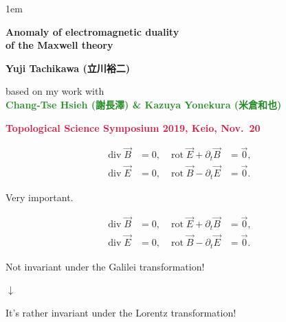 \documentclass[xcolor={svgnames,rgb}]{beamer}
\date[]{}
\def\bff{\ifmmode\else\bfseries\fi}
\def\red#1{\textcolor{Crimson}{\bff #1}}
\def\green#1{\textcolor{ForestGreen}{\bff #1}}
\def\blue#1{\textcolor{myblue}{\bff #1}}
\def\alert#1{\red{#1}}
\begin{document}
\parskip1em 
\boldmath
\def\baselinestretch{1.1}



\def\incb#1{\vcenter{\hbox{\texttt{[image: \#1]}}}}
\def\inc#1{\vcenter{\hbox{\texttt{[image: \#1]}}}}
\def\incx#1{\vcenter{\hbox{\texttt{[image: \#1]}}}}
\def\incc#1{\vcenter{\hbox{\texttt{[image: \#1]}}}}

\begin{frame}
\bigskip\bigskip\bigskip\bigskip\bigskip

\vfill


\begin{exampleblock}{}
\begin{center}\LARGE\bfseries
\color{math}
Anomaly of electromagnetic duality \\
of the Maxwell theory
\end{center}
\end{exampleblock}

\bigskip\bigskip\bigskip
\begin{center}
\large  \blue{Yuji Tachikawa (立川裕二)} 

based on my work with \\
\green{Chang-Tse Hsieh (謝長澤) \& Kazuya Yonekura (米倉和也)}

\bigskip
\large \alert{Topological Science Symposium 2019, Keio, Nov.~20}

\end{center}
\bigskip\bigskip\bigskip
\vfill


\end{frame}



\def\div{\mathop{\mathrm{div}}}
\def\rot{\mathop{\mathrm{rot}}}
\begin{frame}
\LARGE
\begin{align*}
\div \vec B&=0,  &\rot \vec E + \partial_t \vec B&=\vec 0, \\
\div \vec E&=0, & \rot \vec B - \partial_t \vec E&=\vec 0.
\end{align*}
\begin{center}

\bigskip\bigskip

Very important.
\end{center}

\end{frame}

\begin{frame}
\LARGE
\begin{align*}
\div \vec B&=0,  &\rot \vec E + \partial_t \vec B&=\vec 0, \\
\div \vec E&=0, & \rot \vec B - \partial_t \vec E&=\vec 0.
\end{align*}
\begin{center}
Not invariant under the Galilei transformation!

$\downarrow$

It's rather invariant under the Lorentz transformation!
\end{center}

\end{frame}
\end{document}

